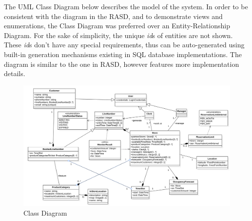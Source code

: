 The UML Class Diagram below describes the model of the system.
In order to be consistent with the diagram in the RASD, and to demonstrate views and enumerations, the Class Diagram was preferred over an Entity-Relationship Diagram.
For the sake of simplicity, the unique \textit{id}s of entities are not shown.
These \textit{id}s don't have any special requirements, thus can be auto-generated using built-in generation mechanisms existing in SQL database implementations.
The diagram is similar to the one in RASD, however features more implementation details.

\begin{figure}[H]
    \centering
    \includegraphics[height=0.5\textwidth]{Images/ClassDiagram.png}
    \caption{Class Diagram}
    \label{fig:ClassDiagram}
\end{figure}

